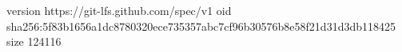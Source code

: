 version https://git-lfs.github.com/spec/v1
oid sha256:5f83b1656a1dc8780320ece735357abc7cf96b30576b8e58f21d31d3db118425
size 124116
